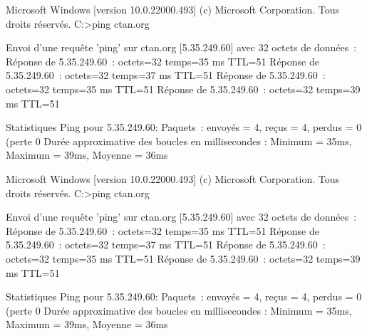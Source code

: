 \documentclass{article}
\begin{document}
\begin{codesortie}
\end{codesortie}

\begin{codetex}
\begin{PLtermwin}[15cm]{} %
Microsoft Windows [version 10.0.22000.493]
(c) Microsoft Corporation. Tous droits réservés.
C:\Users\test>ping ctan.org

Envoi d’une requête 'ping' sur ctan.org [5.35.249.60] avec 32 octets de données :
Réponse de 5.35.249.60 : octets=32 temps=35 ms TTL=51
Réponse de 5.35.249.60 : octets=32 temps=37 ms TTL=51
Réponse de 5.35.249.60 : octets=32 temps=35 ms TTL=51
Réponse de 5.35.249.60 : octets=32 temps=39 ms TTL=51

Statistiques Ping pour 5.35.249.60:
Paquets : envoyés = 4, reçus = 4, perdus = 0 (perte 0%
Durée approximative des boucles en millisecondes :
Minimum = 35ms, Maximum = 39ms, Moyenne = 36ms
\end{PLtermwin}

\end{codetex}

\begin{codesortie}
\begin{PLtermwin}[15cm]{}
Microsoft Windows [version 10.0.22000.493]
(c) Microsoft Corporation. Tous droits réservés.
C:\Users\test>ping ctan.org

Envoi d’une requête 'ping' sur ctan.org [5.35.249.60] avec 32 octets de données :
Réponse de 5.35.249.60 : octets=32 temps=35 ms TTL=51
Réponse de 5.35.249.60 : octets=32 temps=37 ms TTL=51
Réponse de 5.35.249.60 : octets=32 temps=35 ms TTL=51
Réponse de 5.35.249.60 : octets=32 temps=39 ms TTL=51

Statistiques Ping pour 5.35.249.60:
Paquets : envoyés = 4, reçus = 4, perdus = 0 (perte 0%
Durée approximative des boucles en millisecondes :
Minimum = 35ms, Maximum = 39ms, Moyenne = 36ms
\end{PLtermwin}


\end{codesortie}
\end{document}
